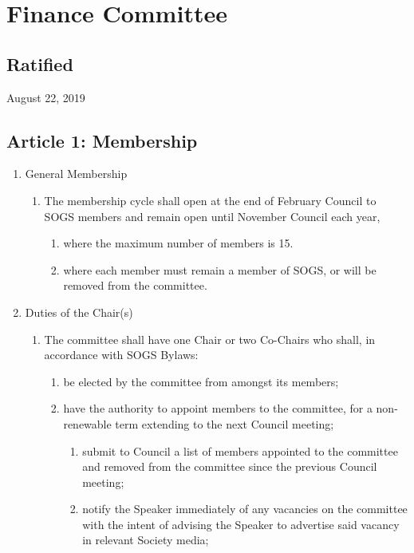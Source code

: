 \section{Finance Committee}

\subsection{Ratified}
August 22, 2019

\subsection{Article 1: Membership}
\begin{enumerate}[label*=\arabic*., align=left]	
\item General Membership
\begin{enumerate}[label*=\arabic*., align=left]	
	\item The membership cycle shall open at the end of February Council to SOGS members and remain open until November Council  each year, 
	\begin{enumerate}[label*=\arabic*., align=left]
		\item where the maximum number of members is 15.
		\item where each member must remain a member of SOGS, or will be removed from the committee.
		\end{enumerate}
	\end{enumerate}
\item Duties of the Chair(s)
\begin{enumerate}[label*=\arabic*., align=left]
	\item The committee shall have one Chair or two Co-Chairs who shall, in accordance with SOGS Bylaws:
	\begin{enumerate}[label*=\arabic*., align=left]
		\item be elected by the committee from amongst its members;
		\item have the authority to appoint members to the committee, for a non-renewable term extending to the next Council meeting;
		\begin{enumerate}[label*=\arabic*., align=left]
			\item submit to Council a list of members appointed to the committee and removed from the committee since the previous Council meeting;
			\item notify the Speaker immediately of any vacancies on the committee with the intent of advising the Speaker to advertise said vacancy in relevant Society media;

\end{enumerate}
\end{enumerate}
\end{enumerate}
\end{enumerate}
